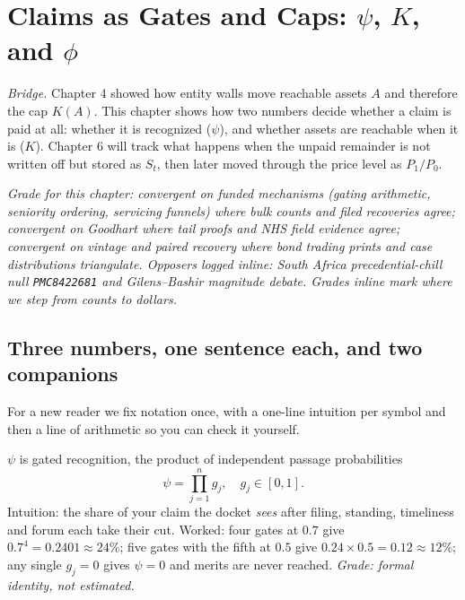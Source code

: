 \chapter{Claims as Gates and Caps: $\psi$, $K$, and $\phi$}
\label{ch:claims}

\textit{Bridge.} Chapter 4 showed how entity walls move reachable assets $A$ and therefore the cap $K(A)$. This chapter shows how two numbers decide whether a claim is paid at all: whether it is recognized ($\psi$), and whether assets are reachable when it is ($K$). Chapter 6 will track what happens when the unpaid remainder is not written off but stored as $S_t$, then later moved through the price level as $P_1/P_0$.

\textit{Grade for this chapter: convergent on funded mechanisms (gating arithmetic, seniority ordering, servicing funnels) where bulk counts and filed recoveries agree; convergent on Goodhart where tail proofs and NHS field evidence agree; convergent on vintage and paired recovery where bond trading prints and case distributions triangulate. Opposers logged inline: South Africa precedential-chill null \texttt{PMC8422681} and Gilens--Bashir magnitude debate. Grades inline mark where we step from counts to dollars.}

\section{Three numbers, one sentence each, and two companions}
\label{sec:claims-defs}

For a new reader we fix notation once, with a one-line intuition per symbol and then a line of arithmetic so you can check it yourself.

$\psi$ is gated recognition, the product of independent passage probabilities
\begin{equation}
\psi = \prod_{j=1}^{n} g_j,\quad g_j \in [0,1].
\label{eq:psi5}
\end{equation}
Intuition: the share of your claim the docket \textit{sees} after filing, standing, timeliness and forum each take their cut. Worked: four gates at $0.7$ give $0.7^4=0.2401\approx24\%$; five gates with the fifth at $0.5$ give $0.24\times0.5=0.12\approx12\%$; any single $g_j=0$ gives $\psi=0$ and merits are never reached. \textit{Grade: formal identity, not estimated.}

